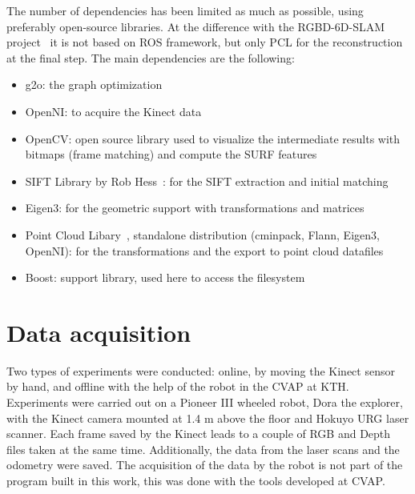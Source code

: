 The number of dependencies has been limited as much as possible, using preferably open-source libraries. At the difference with the RGBD-6D-SLAM project~\cite{engelhard11euron-workshop} it is not based on \gls{ROS} framework, but only \gls{PCL} for the reconstruction at the final step. The main dependencies are the following:
\begin{itemize}
\item g2o: the graph optimization
\item OpenNI: to acquire the Kinect data
\item OpenCV: open source library used to visualize the intermediate results with bitmaps (frame matching) and compute the \gls {SURF} features
\item SIFT Library by Rob Hess~\cite{hess_sift}: for the \gls{SIFT} extraction and initial matching
\item Eigen3: for the geometric support with transformations and matrices
\item Point Cloud Libary~\cite{Rusu_ICRA2011_PCL}, standalone distribution (cminpack, Flann, Eigen3, OpenNI): for the transformations and the export to point cloud datafiles
\item Boost: support library, used here to access the filesystem
\end{itemize}


\section{Data acquisition}

Two types of experiments were conducted: online, by moving the Kinect sensor by hand, and offline with the help of the robot in the \gls{CVAP} at KTH. Experiments were carried out on a Pioneer III wheeled robot, Dora the explorer, with the Kinect camera mounted at 1.4 m above the floor and Hokuyo URG laser scanner. Each frame saved by the Kinect leads to a couple of RGB and Depth files taken at the same time. Additionally, the data from the laser scans and the odometry were saved. The acquisition of the data by the robot is not part of the program built in this work, this was done with the tools developed at \gls{CVAP}.

